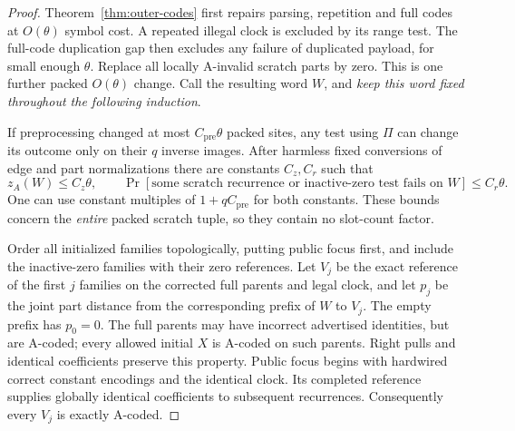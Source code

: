 \begin{proof}
Theorem~\ref{thm:outer-codes} first repairs parsing, repetition and
full codes at $O(\theta)$ symbol cost.  A repeated illegal clock is
excluded by its range test.  The full-code duplication gap then
excludes any failure of duplicated payload, for small enough $\theta$.
Replace all locally A-invalid scratch parts by zero.  This is one
further packed $O(\theta)$ change.  Call the resulting word $W$, and
\emph{keep this word fixed throughout the following induction}.

If preprocessing changed at most $C_{\mathrm{pre}}\theta$ packed
sites, any test using $\Pi$ can change its outcome only on their
$q$ inverse images.  After harmless fixed conversions of edge and
part normalizations there are constants $C_z,C_r$ such that
\begin{equation}\label{op:fixed-word-invariant}
 z_A(W)\le C_z\theta,\qquad
 \Pr[\text{some scratch recurrence or inactive-zero test fails on }W]
       \le C_r\theta.
\end{equation}
One can use constant multiples of $1+qC_{\mathrm{pre}}$ for both
constants.  These bounds concern the \emph{entire} packed scratch
tuple, so they contain no slot-count factor.

Order all initialized families topologically, putting public focus
first, and include the inactive-zero families with their zero
references.  Let $V_j$ be the exact reference of the first $j$ families
on the corrected full parents and legal clock, and let $p_j$ be the
joint part distance from the corresponding prefix of $W$ to $V_j$.
The empty prefix has $p_0=0$.  The full parents may have incorrect
advertised identities, but are A-coded; every allowed initial $X$
is A-coded on such parents.  Right pulls and identical coefficients
preserve this property.  Public focus begins with hardwired correct
constant encodings and the identical clock.  Its completed reference
supplies globally identical coefficients to subsequent recurrences.
Consequently every $V_j$ is exactly A-coded.


\end{proof}
